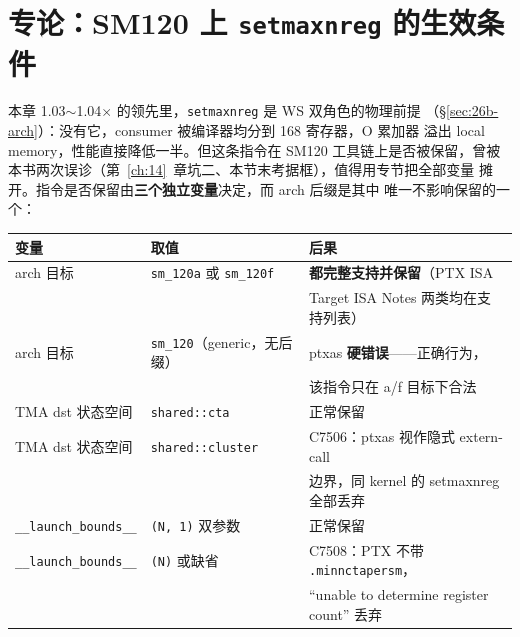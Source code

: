 \section{专论：SM120 上 \texttt{setmaxnreg} 的生效条件}\label{sec:26b-setmaxnreg}

本章 1.03$\sim$1.04$\times$ 的领先里，\texttt{setmaxnreg} 是 WS 双角色的物理前提
（\S\ref{sec:26b-arch}）：没有它，consumer 被编译器均分到 168 寄存器，O 累加器
溢出 local memory，性能直接降低一半。但这条指令在 SM120 工具链上是否被保留，曾被
本书两次误诊（第~\ref{ch:14}~章坑二、本节末考据框），值得用专节把全部变量
摊开。指令是否保留由\textbf{三个独立变量}决定，而 arch 后缀是其中
唯一不影响保留的一个：

\begin{center}
\footnotesize
\begin{tabular}{@{}lll@{}}
\toprule
变量 & 取值 & 后果 \\
\midrule
arch 目标 & \texttt{sm\_120a} 或 \texttt{sm\_120f} & \textbf{都完整支持并保留}（PTX ISA \\
 & & Target ISA Notes 两类均在支持列表） \\
arch 目标 & \texttt{sm\_120}（generic，无后缀） & ptxas \textbf{硬错误}——正确行为， \\
 & & 该指令只在 a/f 目标下合法 \\
TMA dst 状态空间 & \texttt{shared::cta} & 正常保留 \\
TMA dst 状态空间 & \texttt{shared::cluster} & C7506：ptxas 视作隐式 extern-call \\
 & & 边界，同 kernel 的 setmaxnreg 全部丢弃 \\
\texttt{\_\_launch\_bounds\_\_} & \texttt{(N, 1)} 双参数 & 正常保留 \\
\texttt{\_\_launch\_bounds\_\_} & \texttt{(N)} 或缺省 & C7508：PTX 不带 \texttt{.minnctapersm}， \\
 & & ``unable to determine register count'' 丢弃 \\
\bottomrule
\end{tabular}
\end{center}

